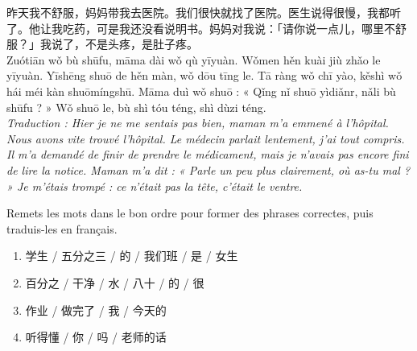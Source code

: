 \documentclass[11pt]{article}
\begin{document}
\begin{textebox}
昨天我不舒服，妈妈带我去医院。我们很快就找\underline{\hspace{1cm}}了医院。医生说得很慢，我都听\underline{\hspace{1cm}}了。他让我吃\underline{\hspace{1cm}}药，可是我还没看\underline{\hspace{1cm}}说明书。妈妈对我说：「请你说\underline{\hspace{1cm}}一点儿，哪里不舒服？」我说\underline{\hspace{1cm}}了，不是头疼，是肚子疼。\\[4pt]
Zuótiān wǒ bù shūfu, māma dài wǒ qù yīyuàn. Wǒmen hěn kuài jiù zhǎo\underline{\hspace{0.8cm}} le yīyuàn. Yīshēng shuō de hěn màn, wǒ dōu tīng\underline{\hspace{0.8cm}} le. Tā ràng wǒ chī\underline{\hspace{0.8cm}} yào, kěshì wǒ hái méi kàn\underline{\hspace{0.8cm}} shuōmíngshū. Māma duì wǒ shuō : « Qǐng nǐ shuō\underline{\hspace{0.8cm}} yìdiǎnr, nǎli bù shūfu ? » Wǒ shuō\underline{\hspace{0.8cm}} le, bù shì tóu téng, shì dùzi téng.\\[4pt]
\emph{Traduction : Hier je ne me sentais pas bien, maman m'a emmené à l'hôpital. Nous avons vite trouvé l'hôpital. Le médecin parlait lentement, j'ai tout compris. Il m'a demandé de finir de prendre le médicament, mais je n'avais pas encore fini de lire la notice. Maman m'a dit : « Parle un peu plus clairement, où as-tu mal ? » Je m'étais trompé : ce n'était pas la tête, c'était le ventre.}
\end{textebox}

\begin{exercice}
Remets les mots dans le bon ordre pour former des phrases correctes, puis traduis-les en français.
\begin{enumerate}
\item 学生 / 五分之三 / 的 / 我们班 / 是 / 女生
\item 百分之 / 干净 / 水 / 八十 / 的 / 很
\item 作业 / 做完了 / 我 / 今天的
\item 听得懂 / 你 / 吗 / 老师的话
\end{enumerate}
\end{exercice}
\end{document}
